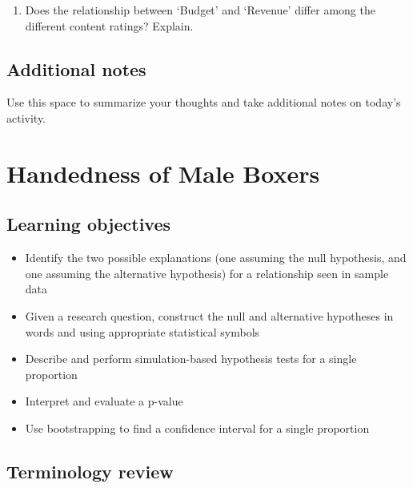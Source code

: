 \documentclass[
]{report}
\providecommand{\tightlist}{%
  \setlength{\itemsep}{0pt}\setlength{\parskip}{0pt}}
\begin{document}
\vspace{0.5in}

\begin{enumerate}
\def\labelenumi{\arabic{enumi}.}
\setcounter{enumi}{25}
\tightlist
\item
  Does the relationship between `Budget' and `Revenue' differ among the different content ratings? Explain.
\end{enumerate}

\vspace{1in}

\hypertarget{additional-notes}{%
\section{Additional notes}\label{additional-notes}}

Use this space to summarize your thoughts and take additional notes on today's activity.

\hypertarget{handedness-of-male-boxers}{%
\chapter{Handedness of Male Boxers}\label{handedness-of-male-boxers}}

\hypertarget{learning-objectives}{%
\section{Learning objectives}\label{learning-objectives}}

\begin{itemize}
\item
  Identify the two possible explanations (one assuming the null hypothesis, and one assuming the alternative hypothesis) for a relationship seen in sample data
\item
  Given a research question, construct the null and alternative hypotheses
  in words and using appropriate statistical symbols
\item
  Describe and perform simulation-based hypothesis tests for a single proportion
\item
  Interpret and evaluate a p-value
\item
  Use bootstrapping to find a confidence interval for a single proportion
\end{itemize}

\hypertarget{terminology-review}{%
\section{Terminology review}\label{terminology-review}}
\end{document}
